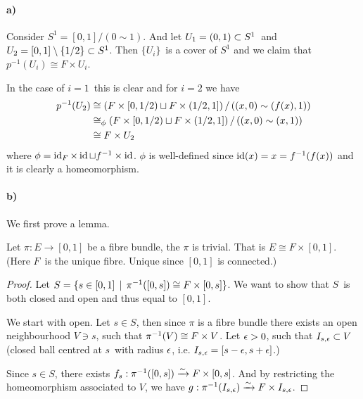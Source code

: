 \documentclass[a4paper,11pt,english]{article}
\begin{document}
\begin{exercise}[3]

\paragraph{a)} Consider $S^1 = [0,1] / (0\sim 1)$. And let $U_1 = (0,1) \ss S^1$ and $U_2 =
[0,1] \setminus \{1/2\} \ss S^1$. Then $\{ U_i \}$ is a cover of $S^1$ and we claim that
$p^{-1}(U_i) \cong F \times U_i$.

In the case of $i=1$ this is clear and for $i=2$ we have
\begin{align*}
p\i (U_2) &\cong \left( F\times [0,1/2) \sqcup F \times (1/2,1] \right) /
\left( (x,0) \sim (f(x),1) \right) \\
&\cong_\phi \left( F\times [0,1/2) \sqcup F \times (1/2,1] \right) /
\left( (x,0) \sim (x,1) \right) \\
&\cong F \times U_2
\end{align*}
where $\phi = \id_F \times \id \sqcup f^{-1} \times \id$. $\phi$ is well-defined
since $\id(x) = x = f^{-1}(f(x))$ and it is clearly a homeomorphism.

\paragraph{b)} We first prove a lemma.

\begin{lemma}
Let $\pi: E \to [0,1]$ be a fibre bundle, the $\pi$ is trivial. That is
$E \cong F \times [0,1]$. (Here $F$ is the unique fibre. Unique since $[0,1]$ is
connected.)
\end{lemma}

\newcommand{\Bes}{I_{s,\eps}}

\begin{proof}
Let $S = \{s\in[0,1] \q| \pi\i([0,s]) \cong F \times [0,s] \}$. We want to show
that $S$ is both closed and open and thus equal to $[0,1]$.

We start with open. Let $s \in S$, then since $\pi$ is a fibre bundle there
exists an open neighbourhood $V\ni s$, such that $\pi\i(V) \cong F \times V$.
Let $\eps > 0$, such that $\Bes \ss V$ (closed ball centred at $s$ with
radius $\eps$, i.e. $\Bes = [s-\eps, s+\eps]$.)

Since $s \in S$, there exists $f_s: \pi\i([0,s]) \congto F\times [0,s]$. And by
restricting the homeomorphism associated to $V$, we have $g: \pi\i(\Bes) \congto F
\times \Bes$.


\end{proof}
\end{exercise}
\end{document}
